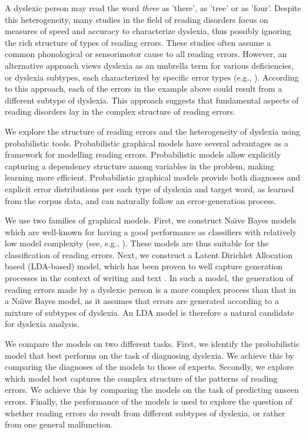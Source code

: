 A dyslexic person may read the word {\it three} as 'there', as 'tree' or as 'four'. Despite this heterogeneity, many studies in the field of reading disorders focus on measures of speed and accuracy to characterize dyslexia, thus possibly ignoring the rich structure of types of reading errors. These studies often assume a common phonological \citep{r14, rrddcw03, s98, s01} or sensorimotor \citep{s01} cause to all reading errors. However, an alternative approach views dyslexia as an umbrella term for various deficiencies, or dyslexia subtypes, each characterized by specific error types (e.g., \citealp{mn73, ellis2013human, ck12, friedmann2016types}). According to this approach, each of the errors in the example above could result from a different subtype of dyslexia. This approach suggests that fundamental aspects of reading disorders lay in the complex structure of reading errors.

We explore the structure of reading errors and the heterogeneity of dyslexia using probabilistic tools. Probabilistic graphical models have several advantages as a framework for modelling reading errors. Probabilistic models allow explicitly capturing a dependency structure among variables in the problem, making learning more efficient. Probabilistic graphical models provide both diagnoses and explicit error distributions per each type of dyslexia and target word, as learned from the corpus data, and can naturally follow an error-generation process.

We use two families of graphical models. First, we construct Na\"{\i}ve Bayes models which are well-known for having a good performance as classifiers with relatively low model complexity (see, e.g., \citealp{lit92}). These models are thus suitable for the classification of reading errors. Next, we construct a Latent Dirichlet Allocation based (LDA-based) model, which has been proven to well capture generation processes in the context of writing and text \citep{bnj03, rgss04}. In such a model, the generation of reading errors made by a dyslexic person is a more complex process than that in a Na\"{\i}ve Bayes model, as it assumes that errors are generated according to a mixture of subtypes of dyslexia. An LDA model is therefore a natural candidate for dyslexia analysis.

We compare the models on two different tasks. First, we identify the probabilistic model that best performs on the task of diagnosing dyslexia. We achieve this by comparing the diagnoses of the models to those of experts. Secondly, we explore which model best captures the complex structure of the patterns of reading errors. We achieve this by comparing the models on the task of predicting unseen errors. Finally, the performance of the models is used to explore the question of whether reading errors do result from different subtypes of dyslexia, or rather from one general malfunction.

